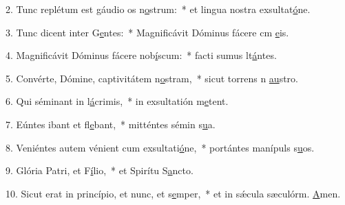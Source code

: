2. Tunc replétum est gáudio os n\uline{o}strum:~* et lingua nostra exsultat\uline{ó}ne.\par 
3. Tunc dicent inter G\uline{e}ntes:~* Magnificávit Dóminus fácere cm \uline{e}is.\par 
4. Magnificávit Dóminus fácere nob\uline{í}scum:~* facti sumus lt\uline{á}ntes.\par 
5. Convérte, Dómine, captivitátem n\uline{o}stram,~* sicut torrens n \uline{au}stro.\par 
6. Qui séminant in l\uline{á}crimis,~* in exsultatión m\uline{e}tent.\par 
7. Eúntes ibant et fl\uline{e}bant,~* mitténtes sémin s\uline{u}a.\par 
8. Veniéntes autem vénient cum exsultati\uline{ó}ne,~* portántes manípuls s\uline{u}os.\par 
9. Glória Patri, et F\uline{í}lio,~* et Spirítu S\uline{a}ncto.\par 
10. Sicut erat in princípio, et nunc, et s\uline{e}mper,~* et in sǽcula sæculórm. \uline{A}men.\par 
